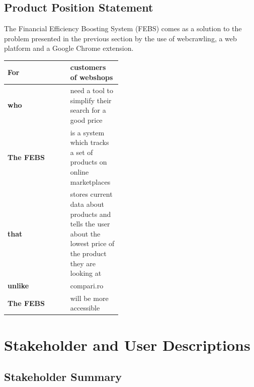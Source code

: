 \documentclass[12pt,a4paper,twoside]{report}
\begin{document}
\subsection{Product Position Statement}

The Financial Efficiency Boosting System (FEBS) comes as a solution to the problem presented in the previous section by the use of webcrawling, a web platform and a Google Chrome extension.

\begin{table}[H]
  \centering
  \begin{tabular}{| g | m{0.45\linewidth} |}
    \hline
    \textbf{For}      & customers of webshops                                                                                           \\
    \hline
    \textbf{who}      & need a tool to simplify their search for a good price                                                           \\
    \hline
    \textbf{The FEBS} & is a system which tracks a set of products on online marketplaces                                               \\
    \hline
    \textbf{that}     & stores current data about products and tells the user about the lowest price of the product they are looking at \\
    \hline
    \textbf{unlike}   & compari.ro                                                                                                      \\
    \hline
    \textbf{The FEBS} &
    will be more accessible                                                                                                             \\
    \hline
  \end{tabular}
  \label{table:product_position_statement}
\end{table}


\section{Stakeholder and User Descriptions}
\subsection{Stakeholder Summary}
\end{document}

